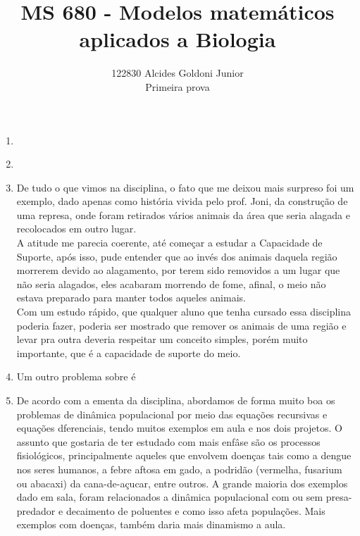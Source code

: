 \documentclass[a4paper]{article}
\title{MS 680 - Modelos matem\'{a}ticos aplicados a Biologia}
\author{122830 Alcides Goldoni Junior\\
  \Small Primeira prova \\
}%
\begin{document}
\maketitle
\begin{enumerate}
\item
\\
\item
\\
\item
De tudo o que vimos na disciplina, o fato que me deixou mais surpreso foi um exemplo, dado apenas como hist\'oria vivida pelo prof. Joni, da constru\c{c}\~ao de uma represa, onde foram retirados v\'arios animais da \'area que seria alagada e recolocados em outro lugar.
\\
A atitude me parecia coerente, at\'e come\c{c}ar a estudar a Capacidade de Suporte, ap\'os isso, pude entender que ao inv\'es dos animais daquela regi\~ao morrerem devido ao alagamento, por terem sido removidos a um lugar que n\~ao seria alagados, eles acabaram morrendo de fome, afinal, o meio n\~ao estava preparado para manter todos aqueles animais.
\\
Com um estudo r\'apido, que qualquer aluno que tenha cursado essa disciplina poderia fazer, poderia ser mostrado que remover os animais de uma regi\~ao e levar pra outra deveria respeitar um conceito simples, por\'em muito importante, que \'e a capacidade de suporte do meio. 
\\
\item
Um outro problema sobre \'e
\\
\item
De acordo com a ementa da disciplina, abordamos de forma muito boa os problemas de din\^amica populacional por meio das equa\c{c}\~oes recursivas e equa\c{c}\~oes dferenciais, tendo muitos exemplos em aula e nos dois projetos. O assunto que gostaria de ter estudado com mais enfâse são os processos fisiol\'ogicos, principalmente aqueles que envolvem doen\c{c}as tais como a dengue nos seres humanos, a febre aftosa em gado, a podrid\~ao (vermelha, fusarium ou abacaxi) da cana-de-a\c{c}ucar, entre outros. A grande maioria dos exemplos dado em sala, foram relacionados a dinâmica populacional com ou sem presa-predador e decaimento de poluentes e como isso afeta popula\c{c}\~oes. Mais exemplos com doen\c{c}as, tamb\'em daria mais dinamismo a aula.

\end{enumerate}
\end{document}
